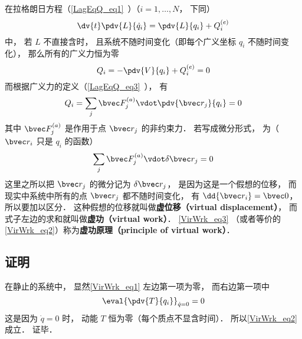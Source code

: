 
\begin{issues}
\issueTODO
\end{issues}


在拉格朗日方程（\autoref{LagEqQ_eq1}~）（$i=1,\dots,N$， 下同）
\begin{equation}\label{VirWrk_eq1}
\dv{t} \pdv{L}{\dot q_i} = \pdv{L}{q_i} + Q_i^{(e)}
\end{equation}
中， 若 $L$ 不直接含时， 且系统不随时间变化（即每个广义坐标 $q_i$ 不随时间变化）， 那么所有的广义力恒为零
\begin{equation}\label{VirWrk_eq2}
Q_i = -\pdv{V}{q_i} + Q_i^{(e)} = 0
\end{equation}
而根据广义力的定义（\autoref{LagEqQ_eq3}~）， 有
\begin{equation}
Q_i = \sum_j \bvec F_j^{(a)} \vdot \pdv{\bvec r_j}{q_i} = 0
\end{equation}
其中 $\bvec F_j^{(a)}$ 是作用于点 $\bvec r_j$ 的非约束力． 若写成微分形式， 为（$\bvec r_i$ 只是 $q_i$ 的函数）
\begin{equation}\label{VirWrk_eq3}
\sum_j \bvec F_j^{(a)} \vdot \delta \bvec r_j = 0
\end{equation}
这里之所以把 $\bvec r_j$ 的微分记为 $\delta \bvec r_j$， 是因为这是一个假想的位移， 而现实中系统中所有的点 $\bvec r_j$ 都不随时间变化， 有 $\dd{\bvec r_i} = \bvec 0$， 所以要加以区分． 这种假想的位移就叫做\textbf{虚位移（virtual displacement）}， 而式子左边的求和就叫做\textbf{虚功（virtual work）}． \autoref{VirWrk_eq3} （或者等价的\autoref{VirWrk_eq2}）称为\textbf{虚功原理（principle of virtual work）}．

\subsection{证明}
在静止的系统中， 显然\autoref{VirWrk_eq1} 左边第一项为零， 而右边第一项中
\begin{equation}
\eval{\pdv{T}{q_i}}_{\dot q = 0} = 0
\end{equation}
这是因为 $\dot q = 0$ 时， 动能 $T$ 恒为零（每个质点不显含时间）． 所以\autoref{VirWrk_eq2} 成立． 证毕．

